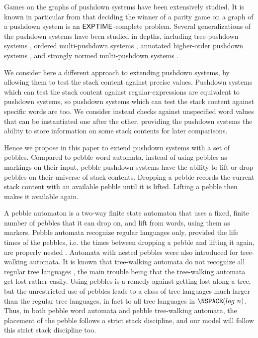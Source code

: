\documentclass[a4paper,UKenglish,cleveref, autoref, thm-restate]{lipics-v2021}
\begin{document}
Games on the graphs of pushdown systems have been extensively studied.
It is known in particular from \cite{walukiewicz1996pushdown} that deciding the winner of a parity game on a graph of a pushdown system is an ${\sf EXPTIME}$-complete problem.
Several generalizations of the pushdown systems 
have been studied in depths, including
tree-pushdown systems \cite{guessarian1983pushdown}, ordered
multi-pushdown systems \cite{breveglieri1996multi, atig2012model}, annotated higher-order pushdown systems \cite{maslov1976multilevel, broadbent2012saturation}, and
strongly normed multi-pushdown systems \cite{czerwinski2012reachability}.




We consider here a different approach to extending pushdown systems, by allowing them to test the stack content against precise values.
Pushdown systems which can test the stack content against regular-expressions are
equivalent to pushdown systems,
so pushdown systems which can test the stack content against specific words are too.
We consider instead checks against unspecified word values that can be instantiated one after the other,
providing the pushdown systems the ability to
store information on some stack contents for later comparisons.



Hence we propose in this paper to extend pushdown systems with a set of pebbles.
Compared to pebble word automata, instead of using pebbles
as markings on their input, pebble pushdown systems have the ability to lift or drop pebbles
on their universe of stack contents. Dropping a pebble records the current stack content with an available pebble until it is lifted. Lifting a pebble then makes it available again.


A pebble automaton is a two-way finite state automaton that uses a fixed, finite number of
pebbles that it can drop on, and lift from 
words, using them as markers.
Pebble automata recognize regular languages only, provided the life times of the pebbles, i.e. the times between dropping a pebble and lifting it again, are properly nested
\cite{globerman1996complexity, engelfriet1999tree}.
Automata with nested pebbles were also introduced
for tree-walking automata. 
It is known that tree-walking automata do not recognize all regular tree languages \cite{bojanczyk2008tree}, the main trouble being that the tree-walking automata get lost rather easily.
Using pebbles is a remedy against getting lost along a tree, but 
the unrestricted use of pebbles leads to a class of tree languages much larger than the
regular tree languages, in fact to all tree languages in $\NSPACE(log ~ n)$.
Thus, in both pebble word automata and pebble tree-walking automata, the placement of the pebble follows a strict stack discipline, and our model will follow this strict stack discipline too.
\end{document}
